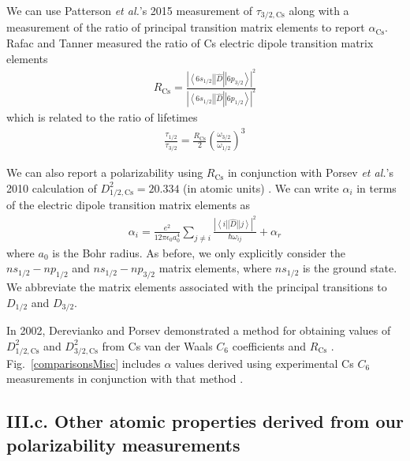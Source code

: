 \documentclass[twocolumn,prl,showpacs,superscriptaddress,longbibliography]{revtex4-1}   %
\newcommand{\brakett}[3]{\left.\left\langle #1 \right|\right|#2\left|\left| #3 \right\rangle\right.}
\newcommand{\figref}[1]{Fig.~\ref{#1}}
\newcommand{\acs}{\alpha_{\textrm{Cs}}}
\newcommand{\rcs}{R_{\mathrm{Cs}}}
\newcommand{\etal}{\textit{et al.}}
\begin{document}
We can use Patterson \etal's 2015 measurement of $\tau_{3/2,\mathrm{Cs}}$ \cite{Patterson2015} along with a measurement of the ratio of principal transition matrix elements to report $\acs$.
Rafac and Tanner measured the ratio of Cs electric dipole transition matrix elements \cite{Rafac1998}
\begin{align}
	\rcs = \frac
	{\left|\brakett{6s_{1/2}}{\hat{D}}{6p_{3/2}}\right|^2}
	{\left|\brakett{6s_{1/2}}{\hat{D}}{6p_{1/2}}\right|^2}
	\label{polFromLifetimes}
\end{align}
which is related to the ratio of lifetimes
\begin{align}
	\frac{\tau_{1/2}}{\tau_{3/2}} = \frac{\rcs}{2} \left( \frac{\omega_{3/2}}{\omega_{1/2}} \right)^3
	\label{RafacRLifetimes}
\end{align}

We can also report a polarizability using $\rcs$ \cite{Rafac1998} in conjunction with Porsev \etal's 2010 calculation of $D_{1/2,\mathrm{Cs}}^2 = 20.334$ (in atomic units) \cite{Porsev2010}.
We can write $\alpha_i$ in terms of the electric dipole transition matrix elements as
\begin{align}
	\alpha_i = \frac{e^2}{12 \pi \epsilon_0 a_0^4} \sum_{j\neq i}	
	\frac{\left|\brakett{i}{\hat{D}}{j}\right|^2}{\hbar\omega_{ij}}	
	+ \alpha_r
	\label{polFromMatrixElements}
\end{align}
where $a_0$ is the Bohr radius. 
As before, we only explicitly consider the $ns_{1/2}-np_{1/2}$ and $ns_{1/2}-np_{3/2}$ matrix elements, 
where $ns_{1/2}$ is the ground state.
We abbreviate the matrix elements associated with the principal transitions to $D_{1/2}$ and $D_{3/2}$.

In 2002, Derevianko and Porsev demonstrated a method for obtaining values of $D_{1/2,\mathrm{Cs}}^2$ and $D_{3/2,\mathrm{Cs}}^2$ from Cs van der Waals $C_6$ coefficients \cite{Derevianko2001} and $\rcs$ \cite{Rafac1998}. \figref{comparisonsMisc} includes $\alpha$ values derived using experimental Cs $C_6$ measurements in conjunction with that method \cite{Leo2000,Chin2004}.

\subsection{III.c. Other atomic properties derived from our polarizability measurements}
\end{document}

